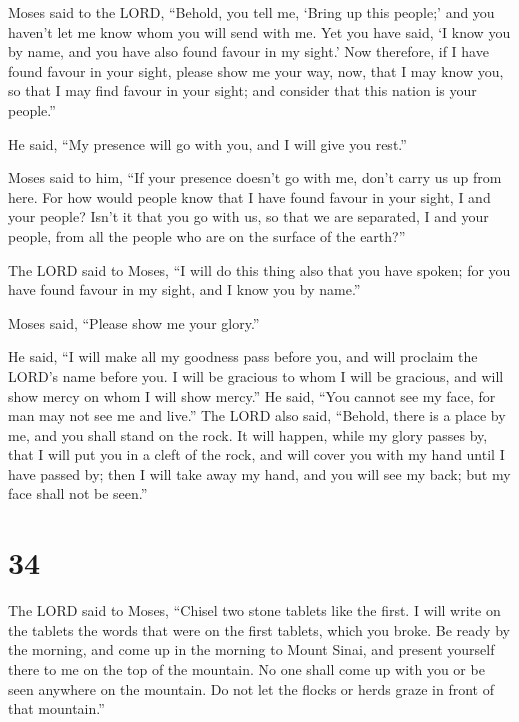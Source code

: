  Moses said to the LORD, ``Behold, you tell me, `Bring up
this people;' and you haven't let me know whom you will send with me.
Yet you have said, `I know you by name, and you have also found favour
in my sight.'  Now therefore, if I have found favour in
your sight, please show me your way, now, that I may know you, so that I
may find favour in your sight; and consider that this nation is your
people.''

 He said, ``My presence will go with you, and I will give
you rest.''

 Moses said to him, ``If your presence doesn't go with
me, don't carry us up from here.  For how would people
know that I have found favour in your sight, I and your people? Isn't it
that you go with us, so that we are separated, I and your people, from
all the people who are on the surface of the earth?''

 The LORD said to Moses, ``I will do this thing also that
you have spoken; for you have found favour in my sight, and I know you
by name.''

 Moses said, ``Please show me your glory.''

 He said, ``I will make all my goodness pass before you,
and will proclaim the LORD's name before you. I will be gracious to whom
I will be gracious, and will show mercy on whom I will show mercy.''
 He said, ``You cannot see my face, for man may not see
me and live.''  The LORD also said, ``Behold, there is a
place by me, and you shall stand on the rock.  It will
happen, while my glory passes by, that I will put you in a cleft of the
rock, and will cover you with my hand until I have passed by;
 then I will take away my hand, and you will see my back;
but my face shall not be seen.''

\hypertarget{section-33}{%
\section{34}\label{section-33}}

 The LORD said to Moses, ``Chisel two stone tablets like
the first. I will write on the tablets the words that were on the first
tablets, which you broke.  Be ready by the morning, and
come up in the morning to Mount Sinai, and present yourself there to me
on the top of the mountain.  No one shall come up with you
or be seen anywhere on the mountain. Do not let the flocks or herds
graze in front of that mountain.''

